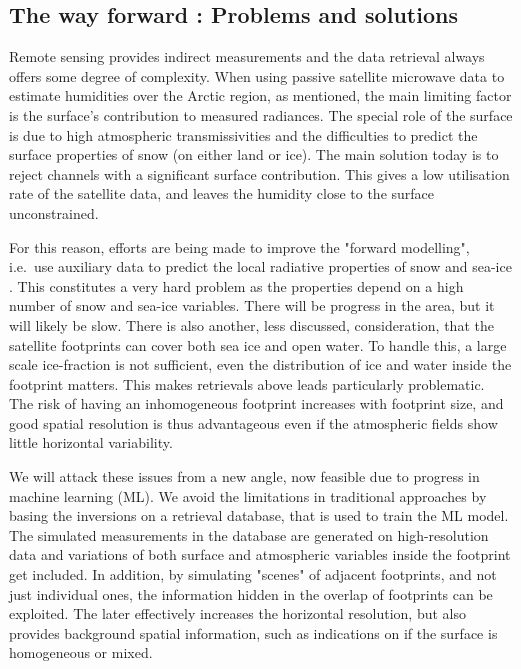 \documentclass[12pt,oneside,a4paper]{article}
\begin{document}
\subsection{The way forward : Problems and solutions }


Remote sensing provides indirect measurements and the data retrieval always offers some degree of complexity. When using passive satellite microwave data to estimate humidities over the Arctic region, as mentioned, the main limiting factor is the surface's contribution to measured radiances. The special role of the surface is due to high atmospheric transmissivities and the difficulties to predict the surface properties of snow (on either land or ice).
The main solution today is to reject channels with a significant surface
contribution. This gives a low utilisation rate of the satellite data, and
leaves the humidity close to the surface unconstrained.

For this reason, efforts are being made to improve the "forward modelling",
i.e.\ use auxiliary data to predict the local radiative properties of snow and
sea-ice \citep[e.g.][]{tonboe:2010:thesi}. This constitutes a very hard problem
as the properties depend on a high number of snow and sea-ice
variables. There will be progress in the area, but it will likely be slow.
There is also another, less discussed, consideration, that the satellite
footprints can cover both sea ice and open water. To handle this, a large scale
ice-fraction is not sufficient, even the distribution of ice and water inside
the footprint matters. This makes retrievals above leads particularly
problematic. The risk of having an inhomogeneous footprint increases with
footprint size, and good spatial resolution is thus advantageous even if the atmospheric fields show little horizontal variability.



We will attack these issues from a new angle, now feasible due to progress in
machine learning (ML). We avoid the limitations in traditional approaches by
basing the inversions on a retrieval database, that is used to train the ML
model. The simulated measurements in the database are generated on
high-resolution data and variations of both surface and atmospheric variables
inside the footprint get included. In addition, by simulating "scenes" of
adjacent footprints, and not just individual ones, the information hidden in the overlap of footprints can be exploited. The later effectively increases the horizontal resolution, but also provides background spatial information, such as indications on if the surface is homogeneous or mixed.
\end{document}
